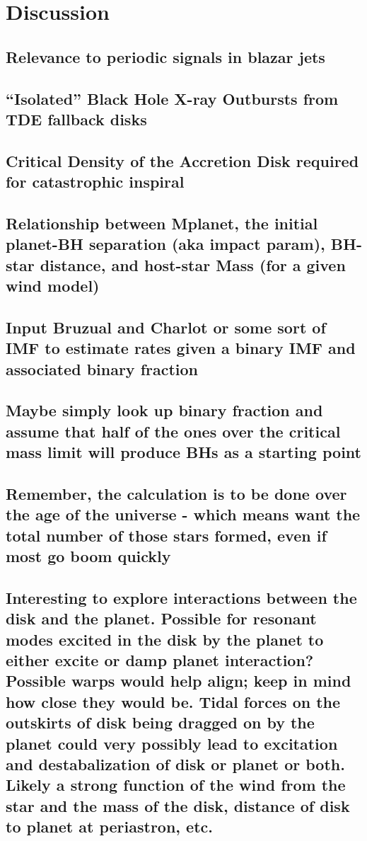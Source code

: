 \section{Discussion}\label{section:conc}


\subsection{Relevance to periodic signals in blazar jets}


\subsection{``Isolated'' Black Hole X-ray Outbursts from TDE fallback disks} 


\subsection{Critical Density of the Accretion Disk required for catastrophic inspiral}


\subsection{Relationship between Mplanet,  the initial planet-BH separation (aka impact param),  BH-star distance, and host-star Mass (for a given wind model)}


\subsection{Input Bruzual and Charlot or some sort of IMF to estimate rates given a binary IMF and associated binary fraction}


\subsection{Maybe simply look up binary fraction and assume that half of the ones over the critical mass limit will produce BHs as a starting point}


\subsection{Remember, the calculation is to be done over the age of the universe - which means want the total number of those stars formed, even if most go boom quickly} 


\subsection{Interesting to explore interactions between the disk and
the planet.  Possible for resonant modes excited in the disk by the
planet to either excite or damp planet interaction? Possible warps
would help align; keep in mind how close they would be.  Tidal
forces on the outskirts of disk being dragged on by the planet could
very possibly lead to excitation and destabalization of disk or
planet or both.  Likely a strong function of the wind from the star
and the mass of the disk, distance of disk to planet at periastron,
etc.}
